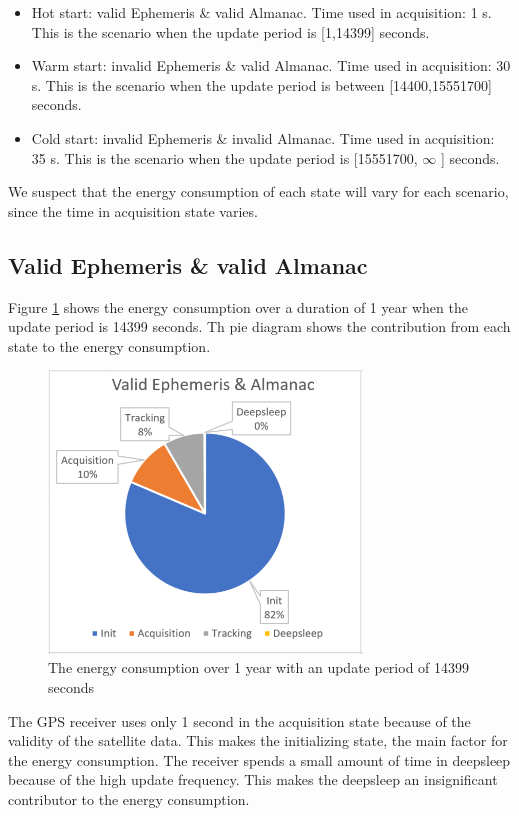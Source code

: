 \begin{itemize}
    \item Hot start: valid Ephemeris \& valid Almanac. Time used in acquisition: 1 s. This is the scenario when the update period is  [1,14399] seconds.
    \item Warm start: invalid Ephemeris \& valid Almanac. Time used in acquisition: 30 s. This is the scenario when the update period is between [14400,15551700] seconds.
    \item Cold start: invalid Ephemeris \& invalid Almanac. Time used in acquisition: 35 s. This is the scenario when the update period is [15551700, $\infty$ ] seconds. 
\end{itemize}

We suspect that the energy consumption of each state will vary for each scenario, since the time in acquisition state varies. 

\subsection{Valid Ephemeris \& valid Almanac}

Figure \ref{fig:firstcase} shows the energy consumption over a duration of 1 year when the update period is 14399 seconds. Th pie diagram shows the contribution from each state to the energy consumption. 

\begin{figure}[H]
\centering
\includegraphics[height=7.5cm]{Project_Report/Images/Allvalid.PNG}
\caption{The energy consumption over 1 year with an update period of 14399 seconds}
\label{fig:firstcase}
\end{figure}

The GPS receiver uses only 1 second in the acquisition state because of the validity of the satellite data. This makes the initializing state, the main factor for the energy consumption. The receiver spends a small amount of time in deepsleep because of the high update frequency. This makes the deepsleep an insignificant contributor to the energy consumption. 

